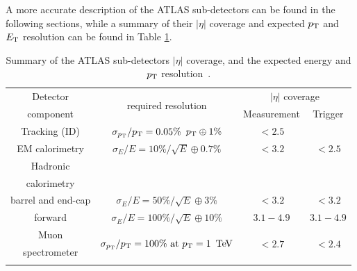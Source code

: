 A more accurate description of the ATLAS sub-detectors can be found in the following sections, while a summary of their $|\eta|$ coverage and expected $p_{\mathrm{T}}$ and $E_{\mathrm{T}}$ resolution can be found in Table \ref{tab:subdetectorResolution}.

\begin{table}[!ht]
  \begin{center}
    \begin{small}
      \setlength{\tabcolsep}{0.0pc}
      \begin{tabular*}{\textwidth}{@{\extracolsep{\fill}}cccc}
        \noalign{\smallskip}\hline\hline\noalign{\smallskip}
         Detector      & \multirow{2}{*}{required resolution} & \multicolumn{2}{c}{$|\eta|$ coverage} \\
         component     &                                      & Measurement       & Trigger \\
        \noalign{\smallskip}\hline\hline\noalign{\smallskip}
        Tracking (ID)  & $\sigma_{p_{\mathrm{T}}}/p_{\mathrm{T}} = 0.05\%$ $p_{\mathrm{T}}\oplus1\%$ & $<2.5$ & \\
        \noalign{\smallskip}\hline\noalign{\smallskip}
        EM calorimetry  & $\sigma_{E}/E = 10\% / \sqrt{E}\oplus0.7\%$ & $<3.2$ & $<2.5$ \\
        \noalign{\smallskip}\hline\noalign{\smallskip}
        Hadronic  &  & & \\
        calorimetry  &  & & \\
        barrel and end-cap  & $\sigma_{E}/E = 50\% / \sqrt{E}\oplus3\%$ & $<3.2$ & $<3.2$ \\
        forward  & $\sigma_{E}/E = 100\% / \sqrt{E}\oplus10\%$ & $3.1-4.9$ & $3.1-4.9$ \\
        \noalign{\smallskip}\hline\noalign{\smallskip}
        Muon  & \multirow{2}{*}{$\sigma_{\pt}/\pt = 100\% \text{ at } \pt = \unit[1]{\TeV}$} & \multirow{2}{*}{$<2.7$} & \multirow{2}{*}{$<2.4$} \\
        spectrometer & & & \\
        \noalign{\smallskip}\hline\hline\noalign{\smallskip}
      \end{tabular*}
    \end{small}
  \end{center}
  \caption[Summary of ATLAS sub-detectors $|\eta|$ coverage and expected resolution.]{Summary of the ATLAS sub-detectors $|\eta|$ coverage, and the expected energy and $p_{\mathrm{T}}$ resolution~\cite{Evans:2008zzb}.}
  \label{tab:subdetectorResolution}
\end{table}


